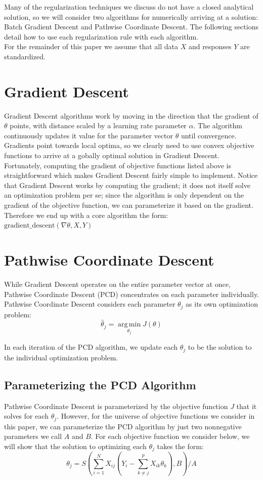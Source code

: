 \documentclass[11pt]{article}
\newcommand{\thh}{\hat{\theta}}
\DeclareMathOperator*{\argmin}{arg\,min}
\begin{document}
Many of the regularization techniques we discuss do not have a closed analytical solution, so we will consider two algorithms for numerically arriving at a solution: Batch Gradient Descent and Pathwise Coordinate Descent.  The following sections detail how to use each regularization rule with each algorithm.  \\

For the remainder of this paper we assume that all data $X$ and responses $Y$ are standardized.  

\section{Gradient Descent}
Gradient Descent algorithms work by moving in the direction that the gradient of $\theta$ points, with distance scaled by a learning rate parameter $\alpha$.  The algorithm continuously updates it value for the parameter vector $\theta$ until convergence.  Gradients point towards local optima, so we clearly need to use convex objective functions to arrive at a gobally optimal solution in Gradient Descent.  Fortunately, computing the gradient of objective functions listed above is straightforward which makes Gradient Descent fairly simple to implement.  Notice that Gradient Descent works by computing the gradient; it does not itself solve an optimization problem per se; since the algorithm is only dependent on the gradient of the objective function, we can parameterize it based on the gradient.  Therefore we end up with a core algorithm the form: $\text{gradient\_descent}(\nabla\theta, X, Y)$

\section{Pathwise Coordinate Descent}
While Gradient Descent operates on the entire parameter vector at once, Pathwise Coordinate Descent (PCD) concentrates on each parameter individually.  Pathwise Coordinate Descent considers each parameter $\theta_j$ as its own optimization problem\cite{ht}:
	$$\thh_j = \argmin\limits_{\theta_j} J(\theta)$$

In each iteration of the PCD algorithm, we update each $\theta_j$ to be the solution to the individual optimization problem.  

\subsection{Parameterizing the PCD Algorithm}
Pathwise Coordinate Descent is parameterized by the objective function $J$ that it solves for each $\theta_j$.  However, for the universe of objective functions we consider in this paper, we can parameterize the PCD algorithm by just two nonnegative parameters we call $A$ and $B$.  For each objective function we consider below, we will show that the solution to optimizing each $\theta_j$ takes the form:
	$$\theta_j = S\left(\sum\limits_{i=1}^N X_{ij}(Y_i - \sum\limits_{k \ne j}^p X_{ik}\theta_k), B\right)/A$$
\end{document}
